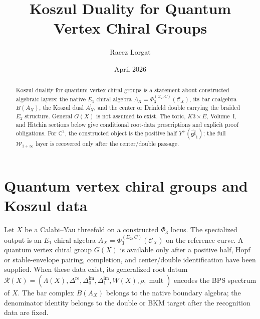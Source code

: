 \documentclass[11pt]{article}
\title{Koszul Duality for Quantum Vertex Chiral Groups}
\author{Raeez Lorgat}
\date{April 2026}
\theoremstyle{definition}
\theoremstyle{remark}
\DeclareMathOperator{\mult}{mult}
\newcommand{\cC}{\mathcal{C}}
\newcommand{\cR}{\mathcal{R}}
\begin{document}
\maketitle

\begin{abstract}
Koszul duality for quantum vertex chiral groups is a statement about
constructed algebraic layers: the native $E_1$ chiral algebra
$A_X=\Phi_3^{(\Sigma_2,C)}(\cC_X)$, its bar coalgebra $B(A_X)$, the
Koszul dual $A_X^!$, and the center or Drinfeld double carrying the
braided $E_2$ structure. General $G(X)$ is not assumed to exist. The
toric, $K3\times E$, Volume~I, and Hitchin sections below give
conditional root-data prescriptions and explicit proof obligations.
For $\mathbb{C}^3$, the constructed object is the positive half
$Y^+(\widehat{\mathfrak{gl}}_1)$; the full
$\mathcal{W}_{1+\infty}$ layer is recovered only after the
center/double passage.
\end{abstract}

\tableofcontents

\section{Quantum vertex chiral groups and Koszul data}
\label{sec:intro}

Let $X$ be a Calabi--Yau threefold on a constructed $\Phi_3$ locus. The
specialized output is an $E_1$ chiral algebra
$A_X=\Phi_3^{(\Sigma_2,C)}(\cC_X)$ on the reference curve. A quantum
vertex chiral group $G(X)$ is available only after a positive half,
Hopf or stable-envelope pairing, completion, and center/double
identification have been supplied. When these data exist, its
generalized root datum
$\cR(X) = (\Lambda(X), \Delta^{\mathrm{re}}, \Delta^{\mathrm{im}}_0,
\Delta^{\mathrm{im}}_1, W(X), \rho, \mult)$ encodes the BPS spectrum of
$X$. The bar complex $B(A_X)$ belongs to the native boundary algebra;
the denominator identity belongs to the double or BKM target after the
recognition data are fixed.
\end{document}
